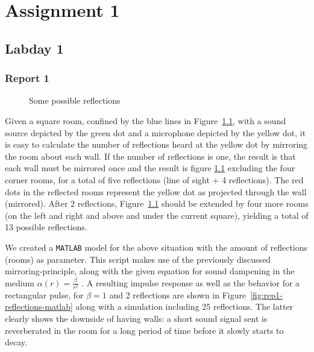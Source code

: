 \documentclass[11pt,titlepage]{report}
\begin{document}
\chapter{Assignment 1}
\section{Labday 1}
\subsection{Report 1}

\begin{figure}[H]
	\centering
	
	\caption{Some possible reflections}
	\label{fig:rep1-reflections-ill}
\end{figure}

Given a square room, confined by the blue lines in Figure~\ref{fig:rep1-reflections-ill}, with a sound source depicted by the green dot and a microphone depicted by the yellow dot, it is easy to calculate the number of reflections heard at the yellow dot by mirroring the room about each wall. If the number of reflections is one, the result is that each wall must be mirrored once and the result is figure \ref{fig:rep1-reflections-ill} excluding the four corner rooms, for a total of five reflections (line of sight + 4 reflections). The red dots in the reflected rooms represent the yellow dot as projected through the wall (mirrored). After 2 reflections, Figure~\ref{fig:rep1-reflections-ill} should be extended by four more rooms (on the left and right and above and under the current square), yielding a total of 13 possible reflections.

We created a \texttt{MATLAB} model for the above situation with the amount of reflections (rooms) as parameter. This script makes use of the previously discussed mirroring-principle, along with the given equation for sound dampening in the medium $\alpha(r) = \frac{\beta}{r^2}$ \cite[91]{epo4-manual}. A resulting impulse response as well as the behavior for a rectangular pulse, for $\beta = 1$ and 2 reflections are shown in Figure~\ref{fig:rep1-reflections-matlab} along with a simulation including 25 reflections. The latter clearly shows the downside of having walls: a short sound signal sent is reverberated in the room for a long period of time before it slowly starts to decay.
\end{document}
